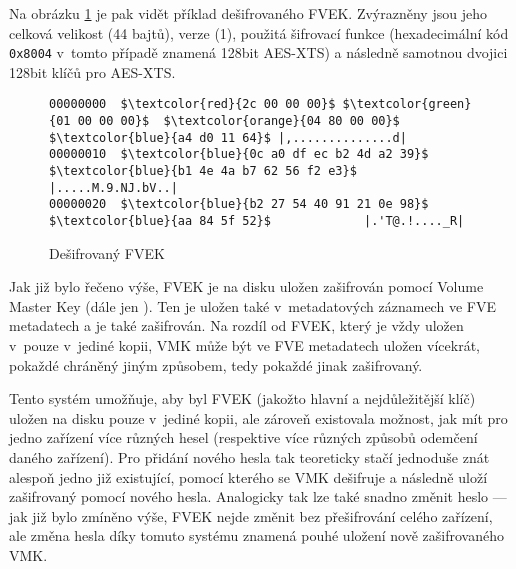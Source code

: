 Na obrázku \ref{fig:fvek-decrypted} je pak vidět příklad dešifrovaného FVEK. Zvýrazněny jsou jeho celková velikost (44 bajtů), verze (1), použitá šifrovací funkce (hexadecimální kód \texttt{0x8004} v~tomto případě znamená 128bit AES-XTS) a následně samotnou dvojici 128bit klíčů pro AES-XTS.

\begin{figure}[h]
		\centering
		\captionsetup{width=0.65\linewidth}
\begin{lstlisting}[frame=none, escapechar=$, basicstyle=\ttfamily\small, columns=fullflexible, keepspaces=true]
00000000  $\textcolor{red}{2c 00 00 00}$ $\textcolor{green}{01 00 00 00}$  $\textcolor{orange}{04 80 00 00}$ $\textcolor{blue}{a4 d0 11 64}$ |,..............d|
00000010  $\textcolor{blue}{0c a0 df ec b2 4d a2 39}$  $\textcolor{blue}{b1 4e 4a b7 62 56 f2 e3}$ |.....M.9.NJ.bV..|
00000020  $\textcolor{blue}{b2 27 54 40 91 21 0e 98}$  $\textcolor{blue}{aa 84 5f 52}$             |.'T@.!...._R|
\end{lstlisting}
		\caption{Dešifrovaný FVEK}
		\label{fig:fvek-decrypted}
\end{figure}


\label{sec:vmk}

Jak již bylo řečeno výše, FVEK je na disku uložen zašifrován pomocí Volume Master Key (dále jen ). Ten je uložen také v~metadatových záznamech ve FVE metadatech a je také zašifrován. Na rozdíl od FVEK, který je vždy uložen v~pouze v~jediné kopii, VMK může být ve FVE metadatech uložen vícekrát, pokaždé chráněný jiným způsobem, tedy pokaždé jinak zašifrovaný.

Tento systém umožňuje, aby byl FVEK (jakožto hlavní a nejdůležitější klíč) uložen na disku pouze v~jediné kopii, ale zároveň existovala možnost, jak mít pro jedno zařízení více různých hesel (respektive více různých způsobů odemčení daného zařízení)\cite{Kornblum2009}. Pro přidání nového hesla tak teoreticky stačí jednoduše znát alespoň jedno již existující\cite{Lich2016}, pomocí kterého se VMK dešifruje a následně uloží zašifrovaný pomocí nového hesla. Analogicky tak lze také snadno změnit heslo --- jak již bylo zmíněno výše, FVEK nejde změnit bez přešifrování celého zařízení, ale změna hesla díky tomuto systému znamená pouhé uložení nově zašifrovaného VMK.

